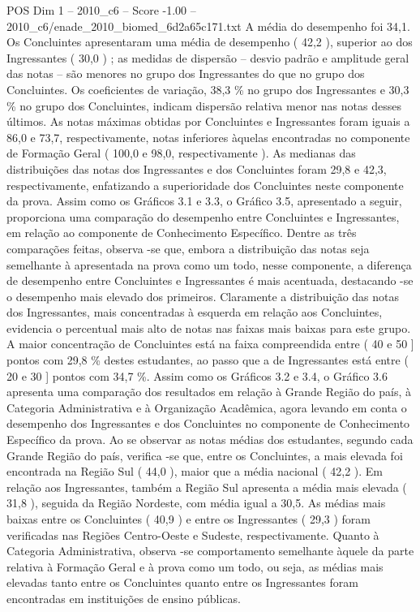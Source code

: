 \begin{textsample}{POS Dim 1 – 2010\_c6 – Score -1.00 – 2010\_c6/enade\_2010\_biomed\_6d2a65c171.txt}
A média do desempenho foi 34,1.
Os Concluintes apresentaram uma média de desempenho ( 42,2 ), superior ao dos Ingressantes ( 30,0 ) ; as medidas de dispersão – desvio padrão e amplitude geral das notas – são menores no grupo dos Ingressantes do que no grupo dos Concluintes.
Os coeficientes de variação, 38,3 \% no grupo dos Ingressantes e 30,3 \% no grupo dos Concluintes, indicam dispersão relativa menor nas notas desses últimos.
As notas máximas obtidas por Concluintes e Ingressantes foram iguais a 86,0 e 73,7, respectivamente, notas inferiores àquelas encontradas no componente de Formação Geral ( 100,0 e 98,0, respectivamente ).
As medianas das distribuições das notas dos Ingressantes e dos Concluintes foram 29,8 e 42,3, respectivamente, enfatizando a superioridade dos Concluintes neste componente da prova.
Assim como os Gráficos 3.1 e 3.3, o Gráfico 3.5, apresentado a seguir, proporciona uma comparação do desempenho entre Concluintes e Ingressantes, em relação ao componente de Conhecimento Específico.
Dentre as três comparações feitas, observa -se que, embora a distribuição das notas seja semelhante à apresentada na prova como um todo, nesse componente, a diferença de desempenho entre Concluintes e Ingressantes é mais acentuada, destacando -se o desempenho mais elevado dos primeiros.
Claramente a distribuição das notas dos Ingressantes, mais concentradas à esquerda em relação aos Concluintes, evidencia o percentual mais alto de notas nas faixas mais baixas para este grupo.
A maior concentração de Concluintes está na faixa compreendida entre ( 40 e 50 ] pontos com 29,8 \% destes estudantes, ao passo que a de Ingressantes está entre ( 20 e 30 ] pontos com 34,7 \%.
Assim como os Gráficos 3.2 e 3.4, o Gráfico 3.6 apresenta uma comparação dos resultados em relação à Grande Região do país, à Categoria Administrativa e à Organização Acadêmica, agora levando em conta o desempenho dos Ingressantes e dos Concluintes no componente de Conhecimento Específico da prova.
Ao se observar as notas médias dos estudantes, segundo cada Grande Região do país, verifica -se que, entre os Concluintes, a mais elevada foi encontrada na Região Sul ( 44,0 ), maior que a média nacional ( 42,2 ).
Em relação aos Ingressantes, também a Região Sul apresenta a média mais elevada ( 31,8 ), seguida da Região Nordeste, com média igual a 30,5.
As médias mais baixas entre os Concluintes ( 40,9 ) e entre os Ingressantes ( 29,3 ) foram verificadas nas Regiões Centro-Oeste e Sudeste, respectivamente.
Quanto à Categoria Administrativa, observa -se comportamento semelhante àquele da parte relativa à Formação Geral e à prova como um todo, ou seja, as médias mais elevadas tanto entre os Concluintes quanto entre os Ingressantes foram encontradas em instituições de ensino públicas.

\end{textsample}
